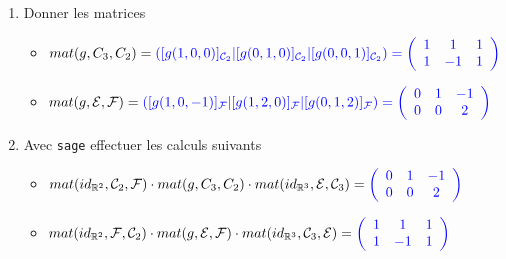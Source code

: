 \documentclass[a4paper,12pt]{article}
\def\R{\mathbb{R}}
\newcommand{\add}[1]{\textcolor{blue}{#1}}
\begin{document}
\begin{exercice}
\begin{enumerate}
\begin{enumerate}
                 \item Donner les matrices
                     \begin{itemize}
                         \item $mat(g,C_3,C_2) = \add{([g(1,0,0)]_{\mathcal C_2}|[g(0,1,0)]_{\mathcal C_2}|[g(0,0,1)]_{\mathcal C_2})=
                             \left(
                             \begin{array}{ccc}
                                 1 & 1 & 1 \\
                                 1 & -1 & 1
                             \end{array}
                             \right)
                             }$
                         \item $mat(g,\mathcal E, \mathcal F) = \add{([g(1,0,-1)]_{\mathcal F}|[g(1,2,0)]_{\mathcal F}|[g(0,1,2)]_{\mathcal F})=
                             \left(
                             \begin{array}{ccc}
                                 0 & 1 & -1 \\
                                 0 & 0 & 2
                             \end{array}
                             \right)
                             }$
                     \end{itemize}
                 \item Avec {\tt sage} effectuer les calculs suivants \\
                     \begin{itemize}
                         \item $ mat(id_{\R^2},\mathcal C_2, \mathcal F)\cdot mat(g,C_3,C_2) \cdot mat(id_{\R^3},\mathcal E, \mathcal C_3) = \add{
                             \left(
                             \begin{array}{ccc}
                                 0 & 1 & -1 \\
                                 0 & 0 & 2
                             \end{array}
                             \right)
                             }$

                         \item $ mat(id_{\R^2},\mathcal F, \mathcal C_2) \cdot mat(g,\mathcal E, \mathcal F) \cdot mat(id_{\R^3},\mathcal C_3, \mathcal E)= \add{
                             \left(
                             \begin{array}{ccc}
                                 1 & 1 & 1 \\
                                 1 & -1 & 1
                             \end{array}
                             \right)
                             }$
                     \end{itemize}


\end{enumerate}
\end{enumerate}
\end{exercice}
\end{document}

